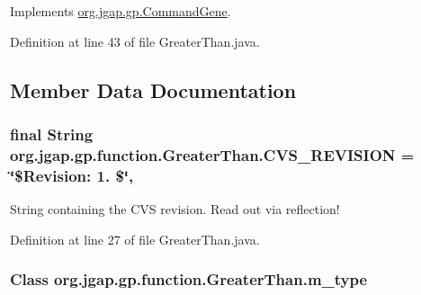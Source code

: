 Implements \hyperlink{classorg_1_1jgap_1_1gp_1_1_command_gene_a236141d99059da808afe7a9217e411c7}{org.\-jgap.\-gp.\-Command\-Gene}.



Definition at line 43 of file Greater\-Than.\-java.



\subsection{Member Data Documentation}
\hypertarget{classorg_1_1jgap_1_1gp_1_1function_1_1_greater_than_a19f0377e7312d2909eafea6bff8300a6}{
\subsubsection[{C\-V\-S\-\_\-\-R\-E\-V\-I\-S\-I\-O\-N}]{\setlength{\rightskip}{0pt plus 5cm}final String org.\-jgap.\-gp.\-function.\-Greater\-Than.\-C\-V\-S\-\_\-\-R\-E\-V\-I\-S\-I\-O\-N = \char`\"{}\$Revision\-: 1. \$\char`\"{}\hspace{0.3cm}{\ttfamily [static]}, {\ttfamily [private]}}}\label{classorg_1_1jgap_1_1gp_1_1function_1_1_greater_than_a19f0377e7312d2909eafea6bff8300a6}
String containing the C\-V\-S revision. Read out via reflection! 

Definition at line 27 of file Greater\-Than.\-java.

\hypertarget{classorg_1_1jgap_1_1gp_1_1function_1_1_greater_than_adfeef436306aacd87bab46bcfbe2d390}{
\subsubsection[{m\-\_\-type}]{\setlength{\rightskip}{0pt plus 5cm}Class org.\-jgap.\-gp.\-function.\-Greater\-Than.\-m\-\_\-type\hspace{0.3cm}{\ttfamily [private]}}}\label{classorg_1_1jgap_1_1gp_1_1function_1_1_greater_than_adfeef436306aacd87bab46bcfbe2d390}


